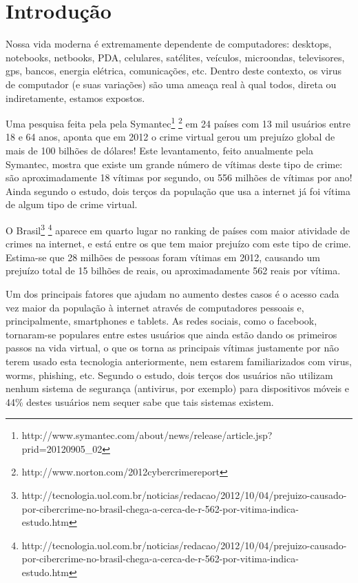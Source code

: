 \chapter{Introdução}

Nossa vida moderna é extremamente dependente de computadores: desktops, notebooks, netbooks, PDA, celulares, satélites, veículos, microondas, televisores, gps, bancos, energia elétrica, comunicações, etc. Dentro deste contexto, os virus de computador (e suas variações) são uma ameaça real à qual todos, direta ou indiretamente, estamos expostos.

Uma pesquisa feita pela pela Symantec\footnote{http://www.symantec.com/about/news/release/article.jsp?prid=20120905\_02} \footnote{http://www.norton.com/2012cybercrimereport} em 24 países com 13 mil usuários entre 18 e 64 anos, aponta que em 2012 o crime virtual gerou um prejuízo global de mais de 100 bilhões de dólares! Este levantamento, feito anualmente pela Symantec, mostra que existe um grande número de vítimas deste tipo de crime: são aproximadamente 18 vítimas por segundo, ou 556 milhões de vítimas por ano! Ainda segundo o estudo, dois terços da população que usa a internet já foi vítima de algum tipo de crime virtual.

O Brasil\footnote{http://tecnologia.uol.com.br/noticias/redacao/2012/10/04/prejuizo-causado-por-cibercrime-no-brasil-chega-a-cerca-de-r-562-por-vitima-indica-estudo.htm} \footnote{http://tecnologia.uol.com.br/noticias/redacao/2012/10/04/prejuizo-causado-por-cibercrime-no-brasil-chega-a-cerca-de-r-562-por-vitima-indica-estudo.htm} aparece em quarto lugar no ranking de países com maior atividade de crimes na internet, e está entre os que tem maior prejuízo com este tipo de crime. Estima-se que 28 milhões de pessoas foram vítimas em 2012, causando um prejuízo total de 15 bilhões de reais, ou aproximadamente 562 reais por vítima.

Um dos principais fatores que ajudam no aumento destes casos é o acesso cada vez maior da população à internet através de computadores pessoais e, principalmente, smartphones e tablets. As redes sociais, como o facebook, tornaram-se populares entre estes usuários que ainda estão dando os primeiros passos na vida virtual, o que os torna as principais vítimas justamente por não terem usado esta tecnologia anteriormente, nem estarem familiarizados com virus, worms, phishing, etc. Segundo o estudo, dois terços dos usuários não utilizam nenhum sistema de segurança (antivirus, por exemplo) para dispositivos móveis e 44\% destes usuários nem sequer sabe que tais sistemas existem.

